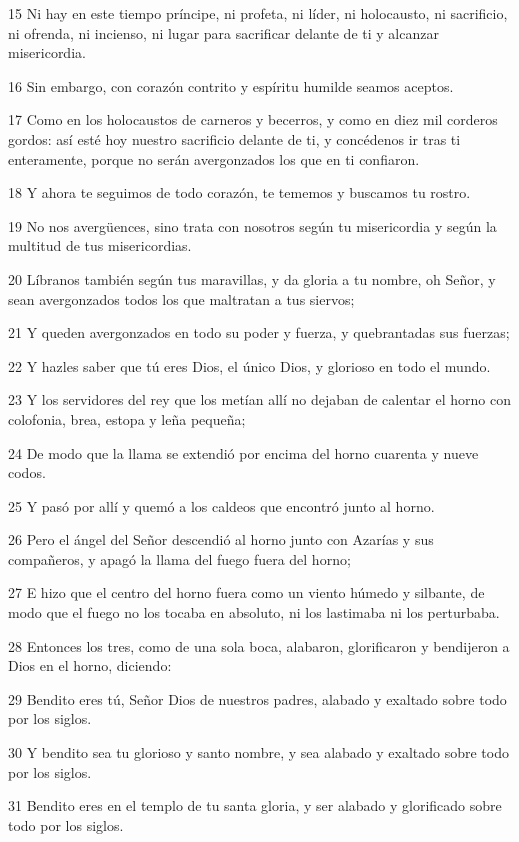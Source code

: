 \par 15 Ni hay en este tiempo príncipe, ni profeta, ni líder, ni holocausto, ni sacrificio, ni ofrenda, ni incienso, ni lugar para sacrificar delante de ti y alcanzar misericordia.
\par 16 Sin embargo, con corazón contrito y espíritu humilde seamos aceptos.
\par 17 Como en los holocaustos de carneros y becerros, y como en diez mil corderos gordos: así esté hoy nuestro sacrificio delante de ti, y concédenos ir tras ti enteramente, porque no serán avergonzados los que en ti confiaron.
\par 18 Y ahora te seguimos de todo corazón, te tememos y buscamos tu rostro.
\par 19 No nos avergüences, sino trata con nosotros según tu misericordia y según la multitud de tus misericordias.
\par 20 Líbranos también según tus maravillas, y da gloria a tu nombre, oh Señor, y sean avergonzados todos los que maltratan a tus siervos;
\par 21 Y queden avergonzados en todo su poder y fuerza, y quebrantadas sus fuerzas;
\par 22 Y hazles saber que tú eres Dios, el único Dios, y glorioso en todo el mundo.
\par 23 Y los servidores del rey que los metían allí no dejaban de calentar el horno con colofonia, brea, estopa y leña pequeña;
\par 24 De modo que la llama se extendió por encima del horno cuarenta y nueve codos.
\par 25 Y pasó por allí y quemó a los caldeos que encontró junto al horno.
\par 26 Pero el ángel del Señor descendió al horno junto con Azarías y sus compañeros, y apagó la llama del fuego fuera del horno;
\par 27 E hizo que el centro del horno fuera como un viento húmedo y silbante, de modo que el fuego no los tocaba en absoluto, ni los lastimaba ni los perturbaba.
\par 28 Entonces los tres, como de una sola boca, alabaron, glorificaron y bendijeron a Dios en el horno, diciendo:
\par 29 Bendito eres tú, Señor Dios de nuestros padres, alabado y exaltado sobre todo por los siglos.
\par 30 Y bendito sea tu glorioso y santo nombre, y sea alabado y exaltado sobre todo por los siglos.
\par 31 Bendito eres en el templo de tu santa gloria, y ser alabado y glorificado sobre todo por los siglos.
